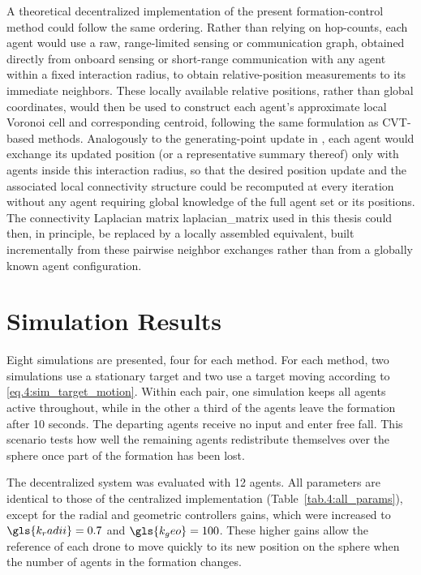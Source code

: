 A theoretical decentralized implementation of the present formation-control method could follow the same ordering. Rather than relying on hop-counts, each agent would use a raw, range-limited sensing or communication graph, obtained directly from onboard sensing or short-range communication with any agent within a fixed interaction radius, to obtain relative-position measurements to its immediate neighbors. These locally available relative positions, rather than global coordinates, would then be used to construct each agent's approximate local Voronoi cell and corresponding centroid, following the same formulation as \gls{CVT}-based methods. Analogously to the generating-point update in \cite{10.1145/2491288.2491296}, each agent would exchange its updated position (or a representative summary thereof) only with agents inside this interaction radius, so that the desired position update and the associated local connectivity structure could be recomputed at every iteration without any agent requiring global knowledge of the full agent set or its positions. The connectivity Laplacian matrix \gls{laplacian_matrix} used in this thesis could then, in principle, be replaced by a locally assembled equivalent, built incrementally from these pairwise neighbor exchanges rather than from a globally known agent configuration.

\section{Simulation Results}

Eight simulations are presented, four for each method. For each method, two simulations use a stationary target and two use a target moving according to \eqref{eq.4:sim_target_motion}. Within each pair, one simulation keeps all agents active throughout, while in the other a third of the agents leave the formation after 10 seconds. The departing agents receive no input and enter free fall. This scenario tests how well the remaining agents redistribute themselves over the sphere once part of the formation has been lost.

The decentralized system was evaluated with 12 agents. All parameters are identical to those of the centralized implementation (Table~\ref{tab.4:all_params}), except for the radial and geometric controllers gains, which were increased to $\gls{k_radii} = 0.7$ and $\gls{k_geo} = 100$. These higher gains allow the reference of each drone to move quickly to its new position on the sphere when the number of agents in the formation changes.

